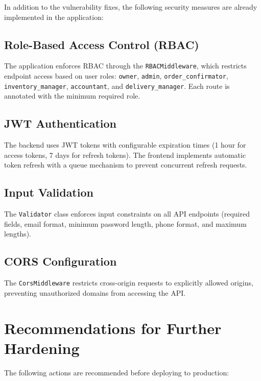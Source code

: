 \documentclass[12pt,a4paper]{article}
\begin{document}
In addition to the vulnerability fixes, the following security measures are already implemented in the application:

\subsection{Role-Based Access Control (RBAC)}

The application enforces RBAC through the \texttt{RBACMiddleware}, which restricts endpoint access based on user roles: \texttt{owner}, \texttt{admin}, \texttt{order\_confirmator}, \texttt{inventory\_manager}, \texttt{accountant}, and \texttt{delivery\_manager}. Each route is annotated with the minimum required role.

\subsection{JWT Authentication}

The backend uses JWT tokens with configurable expiration times (1 hour for access tokens, 7 days for refresh tokens). The frontend implements automatic token refresh with a queue mechanism to prevent concurrent refresh requests.

\subsection{Input Validation}

The \texttt{Validator} class enforces input constraints on all API endpoints (required fields, email format, minimum password length, phone format, and maximum lengths).

\subsection{CORS Configuration}

The \texttt{CorsMiddleware} restricts cross-origin requests to explicitly allowed origins, preventing unauthorized domains from accessing the API.

\section{Recommendations for Further Hardening}

The following actions are recommended before deploying to production:
\end{document}

